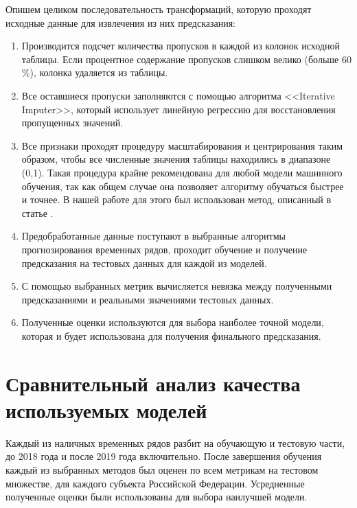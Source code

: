 Опишем целиком последовательность трансформаций, которую проходят исходные данные для извлечения из них предсказания:

\begin{enumerate}
	\item Производится подсчет количества пропусков в каждой из колонок исходной таблицы. Если процентное содержание пропусков слишком велико (больше 60 \%), колонка удаляется из таблицы.
	
	\item Все оставшиеся пропуски заполняются с помощью алгоритма <<Iterative Imputer>>, который использует линейную регрессию для восстановления пропущенных значений.
	
	\item Все признаки проходят процедуру масштабирования и центрирования таким образом, чтобы все численные значения таблицы находились в диапазоне (0,1). Такая процедура крайне рекомендована для любой модели машинного обучения, так как общем случае она позволяет алгоритму обучаться быстрее и точнее. В нашей работе для этого был использован метод, описанный в статье \cite{Умная_нормализация_данных_2020}.
	
	\item Предобработанные данные поступают в выбранные алгоритмы прогнозирования временных рядов, проходит обучение и получение предсказания на тестовых данных для каждой из моделей.
	
	\item С помощью выбранных метрик вычисляется невязка между полученными предсказаниями и реальными значениями тестовых данных.
	
	\item Полученные оценки используются для выбора наиболее точной модели, которая и будет использована для получения финального предсказания.

\end{enumerate}

\section{Сравнительный анализ качества используемых моделей}

Каждый из наличных временных рядов разбит на обучающую и тестовую части, до 2018 года и после 2019 года включительно. После завершения обучения каждый из выбранных методов был оценен по всем метрикам на тестовом множестве, для каждого субъекта Российской Федерации. Усредненные полученные оценки были использованы для выбора наилучшей модели.

